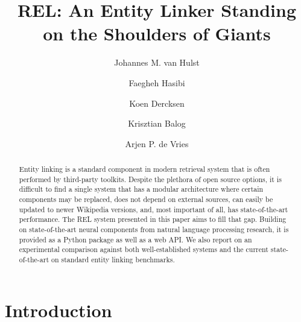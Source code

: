 \documentclass[sigconf]{acmart}
\newcommand{\miniskip}{\vspace*{-.5\baselineskip}}
\begin{document}
\title{REL: An Entity Linker Standing on the Shoulders of Giants} 

\author{Johannes M. van Hulst}

\author{Faegheh Hasibi}

\author{Koen Dercksen}

\author{Krisztian Balog}

\author{Arjen P. de Vries}

\renewcommand{\shortauthors}{J.M. van Hulst, et al.}


\begin{abstract}
Entity linking is a standard component in modern retrieval system that is often performed by third-party toolkits.  Despite the plethora of open source options, it is difficult to find a single system that has a modular architecture where certain components may be replaced, does not depend on external sources, can easily be updated to newer Wikipedia versions, and, most important of all, has state-of-the-art performance.
The REL system presented in this paper aims to fill that gap.
Building on state-of-the-art neural components from natural language processing research, it is provided as a Python package as well as a web API.  We also report on an experimental comparison against both well-established systems and the current state-of-the-art on standard entity linking benchmarks.
\end{abstract}





\maketitle


\miniskip
\section{Introduction}
\label{sec:intro}
\end{document}
